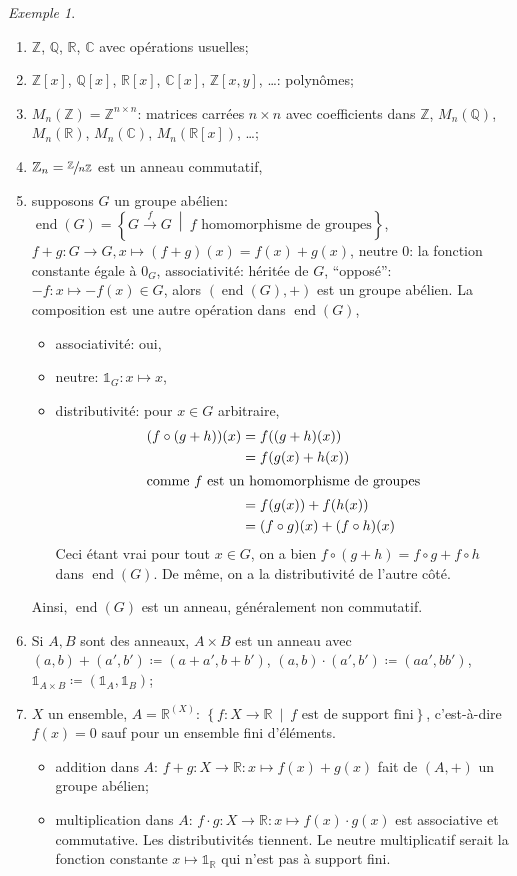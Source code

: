 \documentclass{report}
\theoremstyle{definition}
\theoremstyle{remark}
\newtheorem*{exem}{Exemple}
\def\ZZ{\mathbb{Z}}
\def\QQ{\mathbb{Q}}
\def\RR{\mathbb{R}}
\def\CC{\mathbb{C}}
\def\id{\mathds{1}}
\begin{document}
	\begin{exem}
		\begin{enumerate}[label=\alph*)]
			\item $\ZZ$, $\QQ$, $\RR$, $\CC$ avec op\'erations usuelles;
			\item $\ZZ[x]$, $\QQ[x]$, $\RR[x]$, $\CC[x]$, $\ZZ[x,y]$, \dots: polyn\^omes;
			\item $M_n(\ZZ) = \ZZ^{n \times n}$: matrices carr\'ees $n \times n$ avec coefficients dans $\ZZ$, $M_n(\QQ)$, $M_n(\RR)$, $M_n(\CC)$, $M_n(\RR[x])$, \dots;
			\item $\ZZ_n = \sfrac{\ZZ}{n\ZZ}$ est un anneau commutatif,
			\item supposons $G$ un groupe ab\'elien: $\operatorname{end}(G) = \left\{ G \xrightarrow{f} G ~\middle|~ f\text{ homomorphisme de groupes} \right\}$, $f+g: G \to G, x \mapsto (f+g)(x) = f(x)+g(x)$, neutre $0$: la fonction constante \'egale \`a $0_G$, associativit\'e: h\'erit\'ee de $G$, ``oppos\'e'': $-f:x \mapsto -f(x) \in G$, alors $(\operatorname{end}(G), +)$ est un groupe ab\'elien. La composition est une autre op\'eration dans $\operatorname{end}(G)$,
			\begin{itemize}
				\item associativit\'e: oui,
				\item neutre: $\id_G: x \mapsto x$,
				\item distributivit\'e: pour $x \in G$ arbitraire,
				\begin{align*}
					(f\circ (g+h))(x)&= f((g+h)(x))\\
					&= f(g(x)+h(x))\\
					\shortintertext{comme $f$ est un homomorphisme de groupes}
					&= f(g(x))+f(h(x))\\
					&= (f \circ g)(x) + (f \circ h)(x)
				\end{align*}
				Ceci \'etant vrai pour tout $x \in G$, on a bien $f \circ (g+h) = f \circ g + f \circ h$ dans $\operatorname{end}(G)$. De m\^eme, on a la distributivit\'e de l'autre c\^ot\'e.
			\end{itemize}
			Ainsi, $\operatorname{end}(G)$ est un anneau, g\'en\'eralement non commutatif.
			\item Si $A,B$ sont des anneaux, $A \times B$ est un anneau avec $(a,b)+(a',b') \coloneq (a+a',b+b')$, $(a,b)\cdot(a',b') \coloneq (aa',bb')$, $\id_{A \times B} \coloneq (\id_A,\id_B)$;
			\item $X$ un ensemble, $A = \RR^{(X)}$: $\left\{ f:X \to \RR ~\middle|~ f\text{ est de support fini} \right\}$, c'est-\`a-dire $f(x)=0$ sauf pour un ensemble fini d'\'el\'ements.
			\begin{itemize}
				\item addition dans $A$: $f+g : X \to \RR : x \mapsto f(x)+g(x)$ fait de $(A,+)$ un groupe ab\'elien;
				\item multiplication dans $A$: $f \cdot g : X \to \RR : x \mapsto f(x) \cdot g(x)$ est associative et commutative. Les distributivit\'es tiennent. Le neutre multiplicatif serait la fonction constante $x \mapsto \id_\RR$ qui n'est pas \`a support fini.
			\end{itemize}
		\end{enumerate}
	\end{exem}
\end{document}
